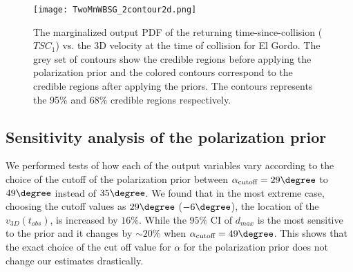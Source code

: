 \begin{figure}
	\texttt{[image: TwoMnWBSG\_2contour2d.png]}
	\caption{The marginalized output PDF of the returning time-since-collision
($TSC_1$) vs. the 3D velocity at the time of collision for El Gordo. The
grey set of contours show the credible regions before applying the
polarization prior and the colored contours correspond to the credible
regions after applying the priors. The contours represents the 95\% and
68\% credible regions respectively. }
	\label{fig:TSC_v3D}
\end{figure}

\subsection{Sensitivity analysis of the polarization prior}
%
\label{sec: sensitivityTests}
We performed tests of how each of the output variables vary according to the
choice of the cutoff of the polarization prior between
$\alpha_{\text{cutoff}} =
29 \degree$ to $49\degree$ instead of $35 \degree$.  
We found that in the most extreme case, choosing the cutoff values as $29
\degree$ ($-6 \degree$), the location of the $v_{3D}(t_{obs})$, is
increased by $ 16 \%$. While the $95\%$ CI of $d_{max}$ is
the most sensitive to the prior and it changes by
$\sim20 \%$ when $\alpha_{\text{cutoff}} = 49 \degree$. 
This shows that the exact choice of the cut off value for $\alpha$ for the
polarization prior does not change our estimates drastically.
%
%
%
